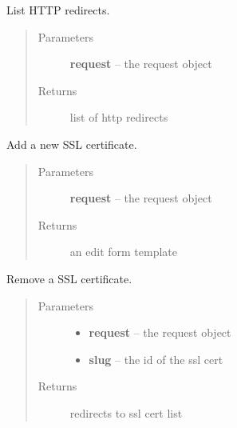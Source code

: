 \documentclass[letterpaper,10pt,english]{sphinxmanual}
\begin{document}

\begin{fulllineitems}
\label{api/web:limeade.web.views.redirect_list}
List HTTP redirects.
\begin{quote}\begin{description}
\item[{Parameters}] \leavevmode
\textbf{request} -- the request object

\item[{Returns}] \leavevmode
list of http redirects

\end{description}\end{quote}

\end{fulllineitems}


\begin{fulllineitems}
\label{api/web:limeade.web.views.sslcert_add}
Add a new SSL certificate.
\begin{quote}\begin{description}
\item[{Parameters}] \leavevmode
\textbf{request} -- the request object

\item[{Returns}] \leavevmode
an edit form template

\end{description}\end{quote}

\end{fulllineitems}


\begin{fulllineitems}
\label{api/web:limeade.web.views.sslcert_delete}
Remove a SSL certificate.
\begin{quote}\begin{description}
\item[{Parameters}] \leavevmode\begin{itemize}
\item {} 
\textbf{request} -- the request object

\item {} 
\textbf{slug} -- the id of the ssl cert

\end{itemize}

\item[{Returns}] \leavevmode
redirects to ssl cert list

\end{description}\end{quote}

\end{fulllineitems}
\end{document}
